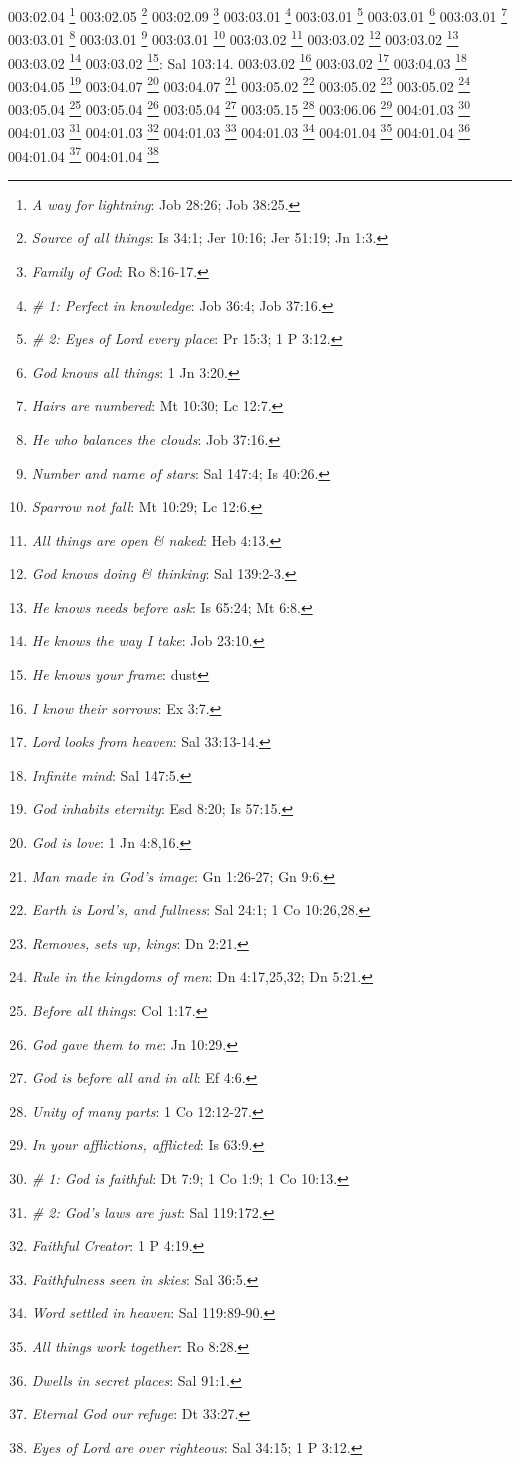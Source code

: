 {{{{{{{{{{{{{003:02.04 \footnote{\textit{A way for lightning}: Job 28:26; Job 38:25.}
003:02.05 \footnote{\textit{Source of all things}: Is 34:1; Jer 10:16; Jer 51:19; Jn 1:3.}
003:02.09 \footnote{\textit{Family of God}: Ro 8:16-17.}
003:03.01 \footnote{\textit{# 1: Perfect in knowledge}: Job 36:4; Job 37:16.}
003:03.01 \footnote{\textit{# 2: Eyes of Lord every place}: Pr 15:3; 1 P 3:12.}
003:03.01 \footnote{\textit{God knows all things}: 1 Jn 3:20.}
003:03.01 \footnote{\textit{Hairs are numbered}: Mt 10:30; Lc 12:7.}
003:03.01 \footnote{\textit{He who balances the clouds}: Job 37:16.}
003:03.01 \footnote{\textit{Number and name of stars}: Sal 147:4; Is 40:26.}
003:03.01 \footnote{\textit{Sparrow not fall}: Mt 10:29; Lc 12:6.}
003:03.02 \footnote{\textit{All things are open & naked}: Heb 4:13.}
003:03.02 \footnote{\textit{God knows doing & thinking}: Sal 139:2-3.}
003:03.02 \footnote{\textit{He knows needs before ask}: Is 65:24; Mt 6:8.}
003:03.02 \footnote{\textit{He knows the way I take}: Job 23:10.}
003:03.02 \footnote{\textit{He knows your frame}: dust}: Sal 103:14.}
003:03.02 \footnote{\textit{I know their sorrows}: Ex 3:7.}
003:03.02 \footnote{\textit{Lord looks from heaven}: Sal 33:13-14.}
003:04.03 \footnote{\textit{Infinite mind}: Sal 147:5.}
003:04.05 \footnote{\textit{God inhabits eternity}: Esd 8:20; Is 57:15.}
003:04.07 \footnote{\textit{God is love}: 1 Jn 4:8,16.}
003:04.07 \footnote{\textit{Man made in God's image}: Gn 1:26-27; Gn 9:6.}
003:05.02 \footnote{\textit{Earth is Lord's, and fullness}: Sal 24:1; 1 Co 10:26,28.}
003:05.02 \footnote{\textit{Removes, sets up, kings}: Dn 2:21.}
003:05.02 \footnote{\textit{Rule in the kingdoms of men}: Dn 4:17,25,32; Dn 5:21.}
003:05.04 \footnote{\textit{Before all things}: Col 1:17.}
003:05.04 \footnote{\textit{God gave them to me}: Jn 10:29.}
003:05.04 \footnote{\textit{God is before all and in all}: Ef 4:6.}
003:05.15 \footnote{\textit{Unity of many parts}: 1 Co 12:12-27.}
003:06.06 \footnote{\textit{In your afflictions, afflicted}: Is 63:9.}
004:01.03 \footnote{\textit{# 1: God is faithful}: Dt 7:9; 1 Co 1:9; 1 Co 10:13.}
004:01.03 \footnote{\textit{# 2: God's laws are just}: Sal 119:172.}
004:01.03 \footnote{\textit{Faithful Creator}: 1 P 4:19.}
004:01.03 \footnote{\textit{Faithfulness seen in skies}: Sal 36:5.}
004:01.03 \footnote{\textit{Word settled in heaven}: Sal 119:89-90.}
004:01.04 \footnote{\textit{All things work together}: Ro 8:28.}
004:01.04 \footnote{\textit{Dwells in secret places}: Sal 91:1.}
004:01.04 \footnote{\textit{Eternal God our refuge}: Dt 33:27.}
004:01.04 \footnote{\textit{Eyes of Lord are over righteous}: Sal 34:15; 1 P 3:12.}
}}}}}}}}}}}}
